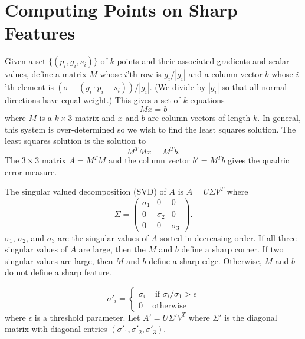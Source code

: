 \section{Computing Points on Sharp Features}
\label{appendix:Lindstrom}

Given a set $\{(p_i,g_i,s_i)\}$ of $k$ points and their associated
gradients and scalar values,
define a matrix $M$ whose $i$'th row is $g_i/|g_i|$
and a column vector $b$ whose $i$'th element is 
$(\sigma - (g_i \cdot p_i + s_i))/|g_i|$.
(We divide by $|g_i|$ so that all normal directions have equal weight.)
This gives a set of $k$ equations
\begin{equation*}
Mx = b
\end{equation*}
where $M$ is a $k\times3$ matrix and $x$ and $b$ are column vectors
of length $k$.
In general, this system is over-determined so we wish to find
the least squares solution.
The least squares solution is the solution to
\begin{equation*}
M^T Mx = M^T b.
\end{equation*}
The $3\times3$ matrix $A=M^T M$ and the column vector $b' = M^T b$
gives the quadric error measure.

The singular valued decomposition (SVD) of $A$
is $A = U \Sigma V^T$ where
\begin{equation*}
\Sigma = \left (
\begin{array}{ccc}
\sigma_1 & 0 & 0 \\
0 & \sigma_2 & 0 \\
0 & 0 & \sigma_3
\end{array}
\right ) .
\end{equation*}
$\sigma_1$, $\sigma_2$, and $\sigma_3$ are the singular values of $A$
sorted in decreasing order.
If all three singular values of $A$ are large,
then the $M$ and $b$ define a sharp corner.
If two singular values are large,
then $M$ and $b$ define a sharp edge.
Otherwise, $M$ and $b$ do not define a sharp feature.

\begin{equation*}
\sigma'_i = \left \{ 
\begin{array}{ll}
\sigma_i & \mbox { if } \sigma_i/\sigma_1 > \epsilon \\
0 & \mbox{otherwise}
\end{array}
\right .
\end{equation*}
where $\epsilon$ is a threshold parameter.
Let $A' = U \Sigma' V^T$ where $\Sigma'$ is the diagonal matrix
with diagonal entries $(\sigma'_1, \sigma'_2, \sigma'_3)$.

